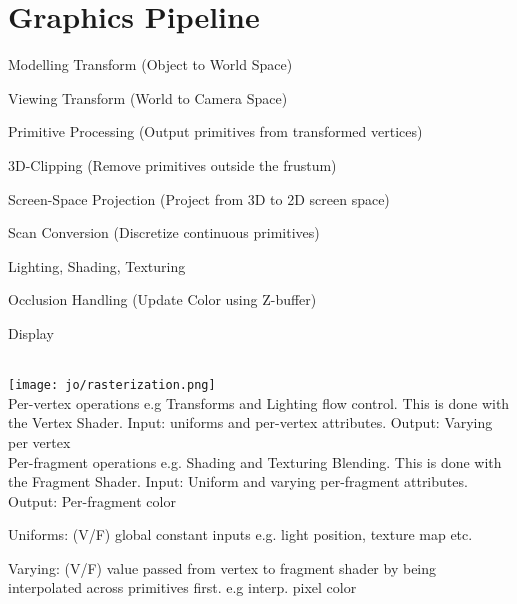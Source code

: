 \section{Graphics Pipeline}

\begin{compactenum}
        \item Modelling Transform (Object to World Space)
        \item Viewing Transform (World to Camera Space)
        \item Primitive Processing (Output primitives from transformed vertices)
        \item 3D-Clipping (Remove primitives outside the frustum)
        \item Screen-Space Projection (Project from 3D to 2D screen space)
        \item Scan Conversion (Discretize continuous primitives)
        \item Lighting, Shading, Texturing
        \item Occlusion Handling (Update Color using Z-buffer)
        \item Display
\end{compactenum}
 \\
\texttt{[image: jo/rasterization.png]} \\
 Per-vertex operations e.g Transforms and Lighting flow control. This is done with the Vertex Shader.  Input: uniforms and per-vertex attributes. Output: Varying per vertex\\
 Per-fragment operations e.g. Shading and Texturing Blending. This is done with the Fragment Shader. Input: Uniform and varying per-fragment attributes. Output: Per-fragment color\\
\begin{compactitem}
    \item Uniforms: (V/F) global constant inputs e.g. light position, texture map etc.
    \item Varying: (V/F) value passed from vertex to fragment shader by being interpolated across primitives first. e.g interp. pixel color
\end{compactitem}


